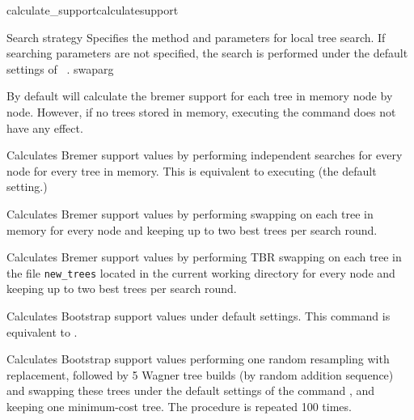 \begin{command}{calculate\_support}{calculatesupport}
\begin{arguments}
\begin{argumentgroup}{Search strategy}
            {Specifies the method and parameters for local tree search. If searching
            parameters are not specified, the search is performed under
            the default settings of ~.} 
            {swaparg}
	     
        		\end{argumentgroup}

	\end{arguments}

    {By default \poy will calculate the bremer support for each tree in memory node by node.
    However, if no trees stored in memory, executing the command
     does not have any effect.}

	\begin{poyexamples} 

            {Calculates Bremer support values by performing
            independent searches for every node for every tree in memory. This is equivalent to executing  (the default setting.)}
         
            {Calculates Bremer support values by performing swapping on 
            each tree in memory for every node and keeping up to two
            best trees per search round.}
          
            {Calculates Bremer support values by performing TBR swapping on 
            each tree in the file \texttt{new\_trees} located in the current
            working directory for every node and keeping up to two
            best trees per search round.}  
            
         {Calculates Bootstrap support values under default settings. This command
         is equivalent to .}
	
            {Calculates Bootstrap support values performing one random resampling with
            replacement, followed by 5 Wagner tree builds (by random addition sequence)
            and swapping these trees under the default settings of the command 
            , and keeping one minimum-cost tree. The procedure
            is repeated 100 times.}
        

\end{poyexamples}
\end{command}
